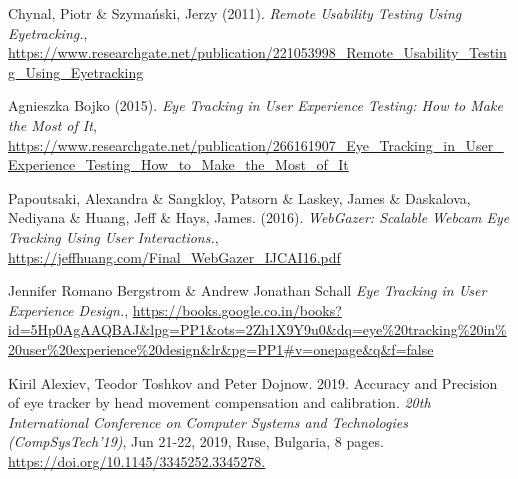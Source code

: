 \documentclass[hidelinks,12pt,a4paper,final]{extreport}
\begin{document}
\newpage
{}
\vspace{0.3cm}
\begin{thebibliography}{}

    Chynal, Piotr \& Szymański, Jerzy (2011). \emph{Remote Usability Testing Using Eyetracking.}, \url{https://www.researchgate.net/publication/221053998_Remote_Usability_Testing_Using_Eyetracking}

    Agnieszka Bojko (2015). \emph{Eye Tracking in User Experience Testing: How to Make the Most of It}, \url{https://www.researchgate.net/publication/266161907_Eye_Tracking_in_User_Experience_Testing_How_to_Make_the_Most_of_It}

    Papoutsaki, Alexandra \& Sangkloy, Patsorn \& Laskey, James \& Daskalova, Nediyana \& Huang, Jeff \& Hays, James. (2016). \emph{WebGazer: Scalable Webcam Eye Tracking Using User Interactions.}, \url{https://jeffhuang.com/Final_WebGazer_IJCAI16.pdf}
    
    Jennifer Romano Bergstrom \& Andrew Jonathan Schall \emph{Eye Tracking in User Experience Design.}, \url{https://books.google.co.in/books?id=5Hp0AgAAQBAJ&lpg=PP1&ots=2Zh1X9Y9u0&dq=eye%20tracking%20in%20user%20experience%20design&lr&pg=PP1#v=onepage&q&f=false}

    Kiril Alexiev, Teodor Toshkov and Peter Dojnow. 2019. Accuracy and Precision of eye tracker by head movement compensation and calibration. \emph{20th International Conference on Computer Systems and Technologies (CompSysTech'19)}, Jun 21-22, 2019, Ruse, Bulgaria, 8 pages. \url{https://doi.org/10.1145/3345252.3345278.}

\end{thebibliography}
\end{document}
